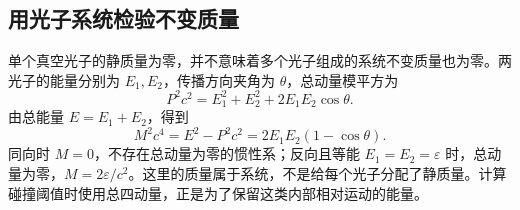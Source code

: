 \subsection{用光子系统检验不变质量}
单个真空光子的静质量为零，并不意味着多个光子组成的系统不变质量也为零。两光子的能量分别为 $E_1,E_2$，传播方向夹角为 $\theta$，总动量模平方为
\[
 P^2c^2=E_1^2+E_2^2+2E_1E_2\cos\theta.
\]
由总能量 $E=E_1+E_2$，得到
\[
 M^2c^4=E^2-P^2c^2=2E_1E_2(1-\cos\theta).
\]
同向时 $M=0$，不存在总动量为零的惯性系；反向且等能 $E_1=E_2=\varepsilon$ 时，总动量为零，$M=2\varepsilon/c^2$。这里的质量属于系统，不是给每个光子分配了静质量。计算碰撞阈值时使用总四动量，正是为了保留这类内部相对运动的能量。
